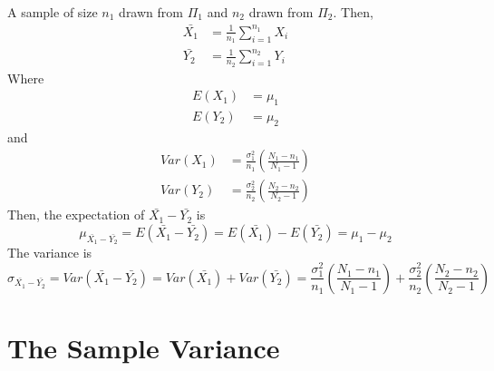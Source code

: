 \documentclass[
]{article}
\begin{document}
A sample of size \(n_1\) drawn from \(\Pi_1\) and \(n_2\) drawn from
\(\Pi_2\). Then, \[\begin{aligned}
\bar{X_1} &= \frac{1}{n_1}\sum_{i = 1}^{n_1}X_i \\
\bar{Y_2} &= \frac{1}{n_2}\sum_{i = 1}^{n_2}Y_i
\end{aligned}\] Where \[\begin{aligned}
E(X_1) &= \mu_1 \\
E(Y_2) &= \mu_2
\end{aligned}\] and \[\begin{aligned}
Var(X_1) &= \frac{\sigma_1^2}{n_1}\left(\frac{N_1-n_1}{N_1-1}\right) \\
Var(Y_2) &= \frac{\sigma_2^2}{n_2}\left(\frac{N_2-n_2}{N_2-1}\right)
\end{aligned}\] Then, the expectation of \(\bar{X_1} - \bar{Y_2}\) is
\[\mu_{\bar{X_1} - \bar{Y_2}} = E(\bar{X_1} - \bar{Y_2}) = E(\bar{X_1}) - E(\bar{Y_2}) = \mu_1 - \mu_2\]
The variance is
\[\sigma_{\bar{X_1} - \bar{Y_2}} = Var(\bar{X_1} - \bar{Y_2}) = Var(\bar{X_1}) + Var(\bar{Y_2}) = \frac{\sigma_1^2}{n_1}\left(\frac{N_1-n_1}{N_1-1}\right) + \frac{\sigma_2^2}{n_2}\left(\frac{N_2-n_2}{N_2-1}\right)\]

\hypertarget{the-sample-variance}{%
\section{The Sample Variance}\label{the-sample-variance}}
\end{document}
